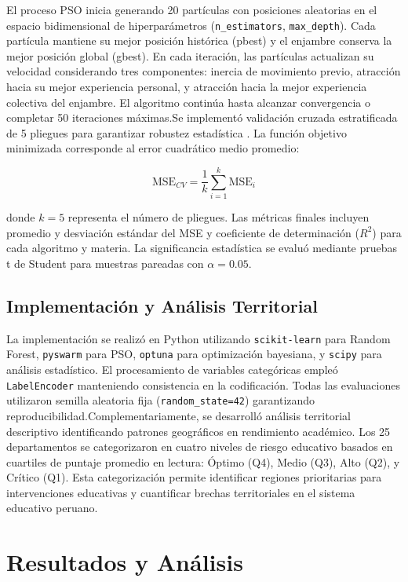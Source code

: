 \documentclass[conference]{IEEEtran}
\begin{document}
El proceso PSO inicia generando 20 partículas con posiciones aleatorias en el espacio bidimensional de hiperparámetros (\texttt{n\_estimators}, \texttt{max\_depth}). Cada partícula mantiene su mejor posición histórica (pbest) y el enjambre conserva la mejor posición global (gbest). En cada iteración, las partículas actualizan su velocidad considerando tres componentes: inercia de movimiento previo, atracción hacia su mejor experiencia personal, y atracción hacia la mejor experiencia colectiva del enjambre. El algoritmo continúa hasta alcanzar convergencia o completar 50 iteraciones máximas.Se implementó validación cruzada estratificada de 5 pliegues para garantizar robustez estadística \cite{kohavi1995study}. La función objetivo minimizada corresponde al error cuadrático medio promedio:

\begin{equation}
\text{MSE}_{CV} = \frac{1}{k} \sum_{i=1}^{k} \text{MSE}_i
\end{equation}

donde $k=5$ representa el número de pliegues. Las métricas finales incluyen promedio y desviación estándar del MSE y coeficiente de determinación ($R^2$) para cada algoritmo y materia. La significancia estadística se evaluó mediante pruebas t de Student para muestras pareadas \cite{dietterich1998approximate} con $\alpha = 0.05$.

\subsection{Implementación y Análisis Territorial}
La implementación se realizó en Python utilizando \texttt{scikit-learn} para Random Forest, \texttt{pyswarm} para PSO, \texttt{optuna} para optimización bayesiana, y \texttt{scipy} para análisis estadístico. El procesamiento de variables categóricas empleó \texttt{LabelEncoder} manteniendo consistencia en la codificación. Todas las evaluaciones utilizaron semilla aleatoria fija (\texttt{random\_state=42}) garantizando reproducibilidad.Complementariamente, se desarrolló análisis territorial descriptivo identificando patrones geográficos en rendimiento académico. Los 25 departamentos se categorizaron en cuatro niveles de riesgo educativo basados en cuartiles de puntaje promedio en lectura: Óptimo (Q4), Medio (Q3), Alto (Q2), y Crítico (Q1). Esta categorización permite identificar regiones prioritarias para intervenciones educativas y cuantificar brechas territoriales en el sistema educativo peruano.

\section{Resultados y Análisis}
\end{document}
